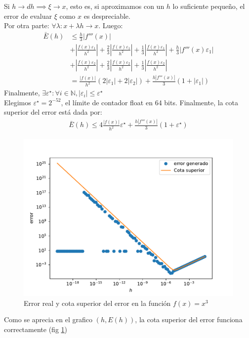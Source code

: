 Si $h\to dh \implies \xi \to x$, esto es, si aproximamos con un $h$ lo suficiente pequeño, el error de evaluar $\xi$ como $x$ es despreciable.\\
Por otra parte: $\forall \lambda: x+\lambda h\to x$. Luego:
\begin{align*}
    \bar{E}(h)&\leq \frac{h}{3}|f'''(x)|\\
    &+\left|\frac{f(x)\varepsilon_1}{h^2}\right|+\frac{2}{3}\left|\frac{f(x)\varepsilon_1}{h^2}\right|+\frac{1}{3}\left|\frac{f(x)\varepsilon_1}{h^2}\right|+\frac{h}{3}\left|f'''(x)\varepsilon_1\right|\\
    &+\left|\frac{f(x)\varepsilon_2}{h^2}\right|+\frac{2}{3}\left|\frac{f(x)\varepsilon_2}{h^2}\right|+\frac{1}{3}\left|\frac{f(x)\varepsilon_2}{h^2}\right|\\
    &=\frac{|f(x)|}{h^2}\left(2|\varepsilon_1|+2|\varepsilon_2|\right)+\frac{h|f'''(x)|}{3}(1+|\varepsilon_1|)
\end{align*}
Finalmente, $\exists \varepsilon^{\star}:\forall i \in \mathbb{N},|\varepsilon_i|\leq\varepsilon^{\star}$\\
Elegimos $\varepsilon^{\star}=2^{-52}$, el límite de contador float en 64 bits. Finalmente, la cota superior del error está dada por:
\begin{align*}
    \bar{E}(h)\leq 4\frac{|f(x)|}{h^2}\varepsilon^{\star}+\frac{h|f'''(x)|}{3}(1+\varepsilon^{\star})
\end{align*}

\begin{figure}
    \centering
    \includegraphics[width=0.5\linewidth]{contenido/img/graficodeerrorcontrol1.pdf}
    \caption{Error real y cota superior del error en la función $f(x)=x^3$}
    \label{fig:errorcontrol1}
\end{figure}
Como se aprecia en el grafico $(h,E(h))$, la cota superior del error funciona correctamente (fig \ref{fig:errorcontrol1})
